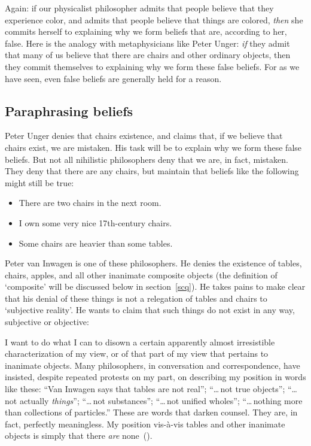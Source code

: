 \documentclass[11pt]{standalone}
\newenvironment{squote}{%
	\begin{spacing}{1}
	\begin{list}{}{%
	\setlength{\labelwidth}{0pt}%
	\rightmargin\leftmargin%
	}
	\item\relax
	}{%
	\end{list}%
	\end{spacing}
	}
\begin{document}
\begin{spacing}{1.5}
Again: if our physicalist philosopher admits that people believe that
they experience color, and admits that people believe that things are
colored, {\em then} she commits herself to explaining why we form
beliefs that are, according to her, false.  Here is the analogy with
metaphysicians like Peter Unger: {\em if} they admit that many of us
believe that there are chairs and other ordinary objects, then they
commit themselves to explaining why we form these false beliefs.  For
as we have seen, even false beliefs are generally held for a reason.

\subsection{Paraphrasing beliefs}
\label{paraphrase}
Peter Unger denies that chairs existence, and claims that, if we
believe that chairs exist, we are mistaken.  His task will be to
explain why we form these false beliefs.  But not all nihilistic
philosophers deny that we are, in fact, mistaken.  They deny that
there are any chairs, but maintain that beliefs like the following
might still be true:

\begin{itemize}
  \item There are two chairs in the next room.
  \item I own some very nice 17th-century chairs.
  \item Some chairs are heavier than some tables.
\end{itemize}

Peter van Inwagen is one of these philosophers.  He denies the
existence of tables, chairs, apples, and all other inanimate composite
objects (the definition of `composite' will be discussed below in
section~\ref{scq}).  He takes pains to make clear that his denial of
these things is not a relegation of tables and chairs to `subjective
reality'.  He wants to claim that such things do not exist in any way,
subjective or objective:
\begin{squote}
I want to do what I can to disown a certain apparently almost
irresistible characterization of my view, or of that part of my view
that pertains to inanimate objects.  Many philosophers, in
conversation and correspondence, have insisted, despite repeated
protests on my part, on describing my position in words like these:
``Van Inwagen says that tables are not real''; ``\ldots\,not true
objects''; ``\ldots\,not actually {\em things}''; ``\ldots\,not
substances''; ``\ldots\,not unified wholes''; ``\ldots\,nothing more
than collections of particles.''  These are words that darken counsel.
They are, in fact, perfectly meaningless.  My position vis-\`{a}-vis
tables and other inanimate objects is simply that there {\em are}
none~(\citeyear[99]{inwagen1995}).
\end{squote}


\end{spacing}
\end{document}
